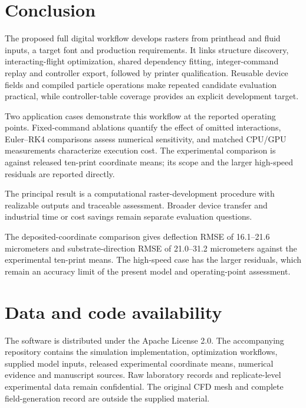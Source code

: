 \section{Conclusion}
The proposed full digital workflow develops rasters from printhead and fluid inputs, a target font and production requirements. It links structure discovery, interacting-flight optimization, shared dependency fitting, integer-command replay and controller export, followed by printer qualification. Reusable device fields and compiled particle operations make repeated candidate evaluation practical, while controller-table coverage provides an explicit development target.

Two application cases demonstrate this workflow at the reported operating points. Fixed-command ablations quantify the effect of omitted interactions, Euler--RK4 comparisons assess numerical sensitivity, and matched CPU/GPU measurements characterize execution cost. The experimental comparison is against released ten-print coordinate means; its scope and the larger high-speed residuals are reported directly.

The principal result is a computational raster-development procedure with realizable outputs and traceable assessment. Broader device transfer and industrial time or cost savings remain separate evaluation questions.

The deposited-coordinate comparison gives deflection RMSE of 16.1--21.6 micrometers and substrate-direction RMSE of 21.0--31.2 micrometers against the experimental ten-print means. The high-speed case has the larger residuals, which remain an accuracy limit of the present model and operating-point assessment.

\section*{Data and code availability}
The software is distributed under the Apache License 2.0. The accompanying repository contains the simulation implementation, optimization workflows, supplied model inputs, released experimental coordinate means, numerical evidence and manuscript sources. Raw laboratory records and replicate-level experimental data remain confidential. The original CFD mesh and complete field-generation record are outside the supplied material.
